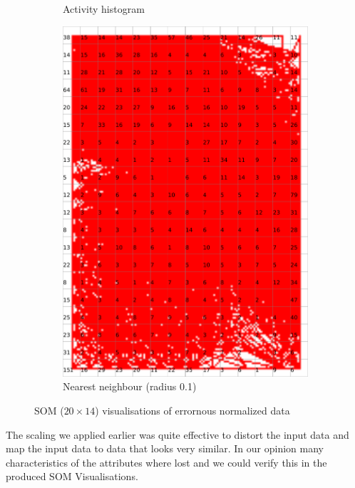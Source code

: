 \documentclass{acm_proc_article-sp}
\begin{document}
\begin{figure}
\begin{subfigure}[b]{0.45\linewidth}
        \caption{Activity histogram}
        \label{fig:wine-weird-activity-histogram}
    \end{subfigure}
    \begin{subfigure}[b]{0.45\linewidth}
        \includegraphics[width=\linewidth]{img/wine-weird-nearest-neighbour-radius}
        \caption{Nearest neighbour (radius 0.1)}
        \label{fig:wine-weird-nearest-neighbour-radius}
    \end{subfigure}
    \caption{SOM ($20\times14$) visualisations of errornous normalized data}
\end{figure}

The scaling we applied earlier was quite effective to distort the input data
and map the input data to data that looks very similar. In our opinion
many characteristics of the attributes where lost and we could verify this
in the produced SOM Visualisations.
\end{document}
